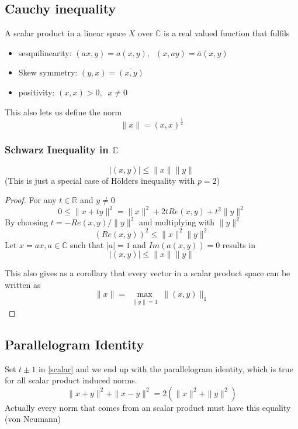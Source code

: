 \documentclass[titlepage]{article}
\begin{document}
\subsection{Cauchy inequality}
A scalar product in a linear space $X$ over  $\mathbb{C}$ is a real valued function that fulfils 
\begin{itemize}
\item sesquilinearity: $(ax,y) = a(x,y),\;\; (x,ay) = \bar{a}(x,y)$ 
\item Skew symmetry: $(y,x) =  \overline{(x,y)}$ 
\item positivity: $(x,x) > 0,  \;\; x\neq 0$ 
\end{itemize}
This also lets us define the norm  
$$\|x\| = (x,x)^{\frac{1}{2}}$$

\subsubsection{Schwarz Inequality in $\mathbb{C}$}
$$|(x,y)| \leq \|x\|\|y\|$$
(This is just a special case of Hölders inequality with $p= 2$)
\begin{proof}
For any $t \in \mathbb{R}$ and $y\neq 0$
\begin{equation}
0\leq \|x+ty\|^2 = \|x\|^2 + 2tRe(x,y) + t^2\|y\|^2 
\label{scalar}
\end{equation}
By choosing $t = -Re(x,y)/\|y\|^2$ and multiplying with $\|y\|^2$
\begin{equation}
\left(Re(x,y)\right)^2 \leq \|x\|^2\|y\|^2
\end{equation}
Let $x = ax, a\in \mathbb{C}$ such that $|a| = 1$ and $Im(a(x,y)) = 0$
results in
\begin{equation}
|(x,y)| \leq \|x\|\|y\|
\end{equation} 

This also gives as a corollary that every vector in a scalar product space can be written as 
$$ \|x\| = \max\limits_{\substack{\|y\| = 1}}\|(x,y)\|_1$$

\end{proof}
\subsection{Parallelogram Identity}
Set $t\pm 1$ in \eqref{scalar} and we end up with the parallelogram identity, which is true for all scalar product induced norms.
\begin{equation}
\label{parallel}
\|x+y\|^2 + \|x-y\|^2 = 2\left(\|x\|^2+ \|y\|^2 \right)
\end{equation}
Actually every norm that comes from an scalar product must have this equality (von Neumann)
\end{document}
